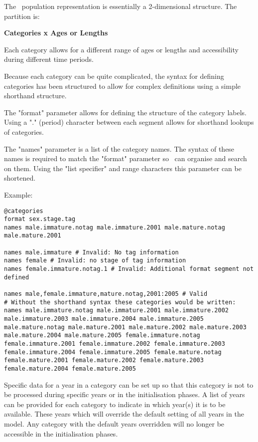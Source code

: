 The \CNAME\ population representation is essentially a 2-dimensional structure. The partition is:

\textbf{Categories x Ages or Lengths}

Each category allows for a different range of ages or lengths and accessibility during different time periods.

Because each category can be quite complicated, the syntax for defining categories has been structured to allow for complex definitions using a simple shorthand structure.

The "format" parameter allows for defining the structure of the category labels. Using a "." (period) character between each segment allows for shorthand lookups of categories.

The "names" parameter is a list of the category names. The syntax of these names is required to match the "format" parameter so \CNAME\ can organise and search on them. Using the "list specifier" and range characters this parameter can be shortened.

Example:

{\small{\begin{verbatim}
@categories
format sex.stage.tag
names male.immature.notag male.immature.2001 male.mature.notag male.mature.2001

names male.immature # Invalid: No tag information
names female # Invalid: no stage of tag information
names female.immature.notag.1 # Invalid: Additional format segment not defined

names male,female.immature,mature.notag,2001:2005 # Valid
# Without the shorthand syntax these categories would be written:
names male.immature.notag male.immature.2001 male.immature.2002 male.immature.2003 male.immature.2004 male.immature.2005 male.mature.notag male.mature.2001 male.mature.2002 male.mature.2003 male.mature.2004 male.mature.2005 female.immature.notag female.immature.2001 female.immature.2002 female.immature.2003 female.immature.2004 female.immature.2005 female.mature.notag female.mature.2001 female.mature.2002 female.mature.2003 female.mature.2004 female.mature.2005
\end{verbatim}}}

Specific data for a year in a category can be set up so that this category is not to be processed during specific years or in the initialisation phases. A list of years can be provided for each category to indicate in which year(s) it is to be available. These years which will override the default setting of all years in the model. Any category with the default years overridden will no longer be accessible in the initialisation phases.

